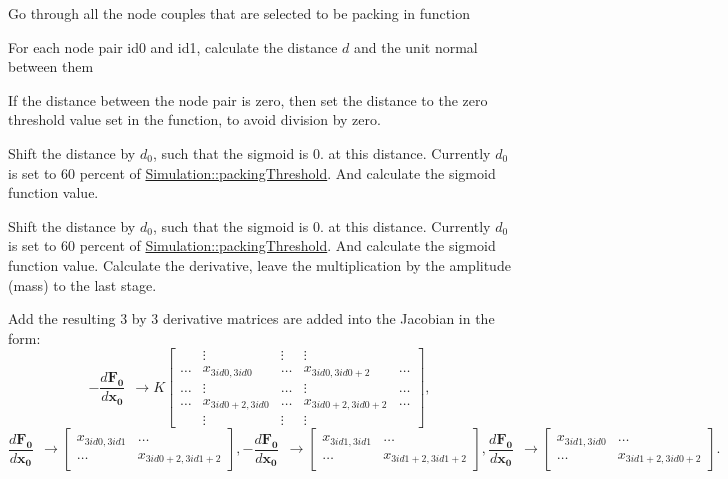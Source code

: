 \begin{DoxyItemize}
\item Go through all the node couples that are selected to be packing in function
\item For each node pair id0 and id1, calculate the distance $ d $ and the unit normal between them
\item If the distance between the node pair is zero, then set the distance to the zero threshold value set in the function, to avoid division by zero.
\item Shift the distance by $ d_{0} $, such that the sigmoid is 0. at this distance. Currently $ d_{0} $ is set to 60 percent of \hyperlink{classSimulation_afa0e72518548c938a0c4974e432f9d83}{Simulation\+::packing\+Threshold}. And calculate the sigmoid function value.
\item Shift the distance by $ d_{0} $, such that the sigmoid is 0. at this distance. Currently $ d_{0} $ is set to 60 percent of \hyperlink{classSimulation_afa0e72518548c938a0c4974e432f9d83}{Simulation\+::packing\+Threshold}. And calculate the sigmoid function value. Calculate the derivative, leave the multiplication by the amplitude (mass) to the last stage.
\item Add the resulting 3 by 3 derivative matrices are added into the Jacobian in the form\+: \[ - \frac{d\mathbf{F_{0}}}{d\mathbf{x_{0}}} \:\: \rightarrow K \begin{bmatrix} & \vdots & \vdots & \vdots & \\ \dots & x_{3id0,3id0} & \dots & x_{3id0,3id0+2} & \dots \\ \dots & \vdots & \dots & \vdots & \dots \\ \dots & x_{3id0+2,3id0} & \dots & x_{3id0+2,3id0+2} & \dots \\ & \vdots & \vdots & \vdots & \end{bmatrix}, \] \[ \frac{d\mathbf{F_{0}}}{d\mathbf{x_{0}}} \:\: \rightarrow \begin{bmatrix} x_{3id0,3id1} & \dots\\ \dots & x_{3id0+2,3id1+2} \end{bmatrix}, -\frac{d\mathbf{F_{0}}}{d\mathbf{x_{0}}} \:\: \rightarrow \begin{bmatrix} x_{3id1,3id1} & \dots\\ \dots & x_{3id1+2,3id1+2} \end{bmatrix}, \frac{d\mathbf{F_{0}}}{d\mathbf{x_{0}}} \:\: \rightarrow \begin{bmatrix} x_{3id1,3id0} & \dots\\ \dots & x_{3id1+2,3id0+2} \end{bmatrix}. \]
\end{DoxyItemize}\hypertarget{classSimulation_a4b259e3827b74767c8005b2126191609}{}
